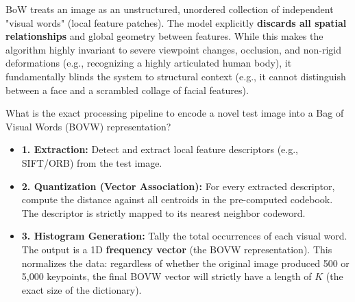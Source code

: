 
{
BoW treats an image as an unstructured, unordered collection of independent "visual words" (local feature patches). The model explicitly \textbf{discards all spatial relationships} and global geometry between features. While this makes the algorithm highly invariant to severe viewpoint changes, occlusion, and non-rigid deformations (e.g., recognizing a highly articulated human body), it fundamentally blinds the system to structural context (e.g., it cannot distinguish between a face and a scrambled collage of facial features).
}


{What is the exact processing pipeline to encode a novel test image into a Bag of Visual Words (BOVW) representation?
\begin{itemize}
    \item \textbf{1. Extraction:} Detect and extract local feature descriptors (e.g., SIFT/ORB) from the test image.
    \item \textbf{2. Quantization (Vector Association):} For every extracted descriptor, compute the distance against all centroids in the pre-computed codebook. The descriptor is strictly mapped to its nearest neighbor codeword.
    \item \textbf{3. Histogram Generation:} Tally the total occurrences of each visual word. The output is a 1D \textbf{frequency vector} (the BOVW representation). This normalizes the data: regardless of whether the original image produced 500 or 5,000 keypoints, the final BOVW vector will strictly have a length of $K$ (the exact size of the dictionary).
\end{itemize}}

